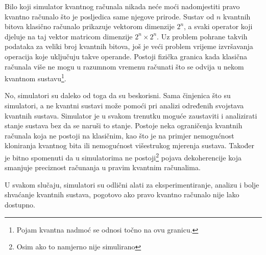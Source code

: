 Bilo koji simulator kvantnog računala nikada neće moći nadomjestiti pravo kvantno računalo što je posljedica same njegove prirode. Sustav od $n$ kvantnih bitova klasično računalo prikazuje vektorom dimenzije $2^n$, a svaki operator koji djeluje na taj vektor matricom dimenzije $2^n \times 2^n$. Uz problem pohrane takvih podataka za veliki broj kvantnih bitova, još je veći problem vrijeme izvršavanja operacija koje uključuju takve operande. Postoji fizička granica kada klasična računala više ne mogu u razumnom vremenu računati što se odvija u nekom kvantnom sustavu\footnote{Pojam kvantna nadmoć  se odnosi točno na ovu granicu.}.

No, simulatori su daleko od toga da su beskorisni. Sama činjenica što su simulatori, a ne kvantni sustavi može pomoći pri analizi određenih svojstava kvantnih sustava. Simulator je u svakom trenutku moguće zaustaviti i analizirati stanje sustava bez da se naruši to stanje. Postoje neka ograničenja kvantnih računala koja ne postoji na klasičnim, kao što je na primjer nemogućnost kloniranja kvantnog bita ili nemogućnost višestrukog mjerenja sustava. Također je bitno spomenuti da u simulatorima ne postoji\footnote{Osim ako to namjerno nije simulirano} pojava dekoherencije koja smanjuje preciznost računanja u pravim kvantnim računalima.

U svakom slučaju, simulatori su odlični alati za eksperimentiranje, analizu i bolje shvaćanje kvantnih sustava, pogotovo ako pravo kvantno računalo nije lako dostupno.









